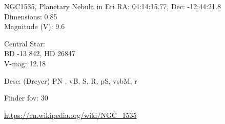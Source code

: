 \begin{block}{NGC1535, Planetary Nebula in Eri}
    RA: 04:14:15.77, Dec: -12:44:21.8 \\ 
    Dimensions: 0.85 \\ 
    Magnitude (V): 9.6

    Central Star: \\ 
      \hspace{1em}BD -13 842, HD 26847 \\ 
      \hspace{1em}V-mag: 12.18 

    Desc: (Dreyer) PN , vB, S, R, pS, vsbM, r 

    Finder fov: 30 

    \url{https://en.wikipedia.org/wiki/NGC_1535} 
\end{block}